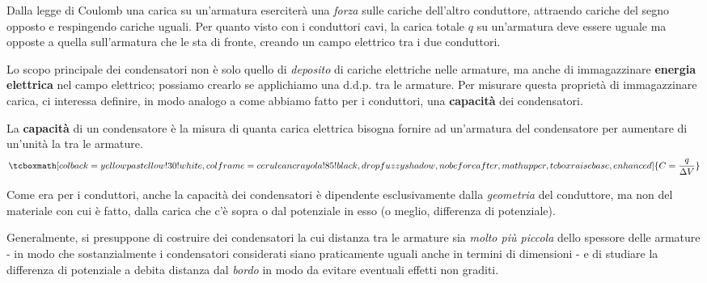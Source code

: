 Dalla legge di Coulomb una carica su un'armatura eserciterà una \textit{forza} sulle cariche dell'altro conduttore, attraendo cariche del segno opposto e respingendo cariche uguali. Per quanto visto con i conduttori cavi, la carica totale $q$ su un'armatura deve essere uguale ma opposte a quella sull'armatura che le sta di fronte, creando un campo elettrico tra i due conduttori.

Lo scopo principale dei condensatori non è solo quello di \textit{deposito} di cariche elettriche nelle armature, ma anche di immagazzinare \textbf{energia elettrica} nel campo elettrico; possiamo crearlo se applichiamo una $\textrm{d.d.p.}$ tra le armature. Per misurare questa proprietà di immagazzinare carica, ci interessa definire, in modo analogo a come abbiamo fatto per i conduttori, una \textbf{capacità} dei condensatori.
\begin{define}
	La \textbf{capacità} di un condensatore è la misura di quanta carica elettrica bisogna fornire ad un'armatura del condensatore per aumentare di un'unità la \ddp tra le armature.
	\begin{equation}
		\tcboxmath[colback=yellowpastellow!30!white,colframe=ceruleancrayola!85!black,drop fuzzy shadow, nobeforeafter, math upper, tcbox raise base, enhanced]{C=\frac{q}{\Delta V}}
	\end{equation}
\end{define}
Come era per i conduttori, anche la capacità dei condensatori è dipendente esclusivamente dalla \textit{geometria} del conduttore, ma non del materiale con cui è fatto, dalla carica che c'è sopra o dal potenziale in esso (o meglio, differenza di potenziale).
\begin{observe}
	Generalmente, si presuppone di costruire dei condensatori la cui distanza tra le armature sia \textit{molto più piccola} dello spessore delle armature - in modo che sostanzialmente i condensatori considerati siano praticamente uguali anche in termini di dimensioni - e di studiare la differenza di potenziale a debita distanza dal \textit{bordo} in modo da evitare eventuali effetti non graditi.
\end{observe}
